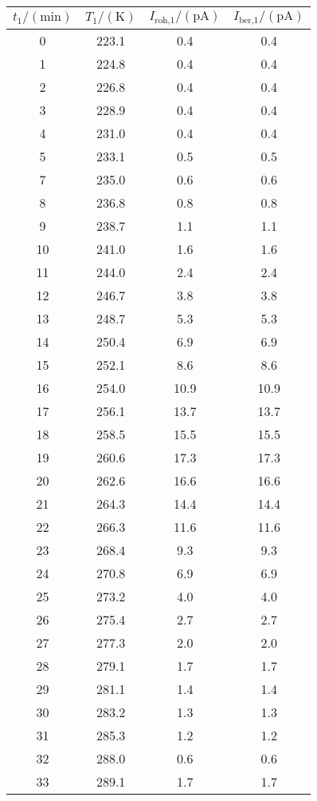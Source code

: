 \label{tab:tabData1}
	\begin{tabular}{S[table-format=2.0]S[table-format=3.1]S[table-format=2.1]S[table-format=2.1]}
		\toprule
		{$t_\text{1}/(\si{\minute})$} & {$T_\text{1}/(\si{\kelvin})$} & {$I_\text{roh,1}/(\si{\pico\ampere})$} & {$I_\text{ber,1}/(\si{\pico\ampere})$} \\
		 & 223.1 & 0.4 & 0.4 \\
		 1 & 224.8 & 0.4 & 0.4 \\
		 2 & 226.8 & 0.4 & 0.4 \\
		 3 & 228.9 & 0.4 & 0.4 \\
		 4 & 231.0 & 0.4 & 0.4 \\
		 5 & 233.1 & 0.5 & 0.5 \\
		 7 & 235.0 & 0.6 & 0.6 \\
		 8 & 236.8 & 0.8 & 0.8 \\
		 9 & 238.7 & 1.1 & 1.1 \\
		10 & 241.0 & 1.6 & 1.6 \\
		11 & 244.0 & 2.4 & 2.4 \\
		12 & 246.7 & 3.8 & 3.8 \\
		13 & 248.7 & 5.3 & 5.3 \\
		14 & 250.4 & 6.9 & 6.9 \\
		15 & 252.1 & 8.6 & 8.6 \\
		16 & 254.0 & 10.9 & 10.9 \\
		17 & 256.1 & 13.7 & 13.7 \\
		18 & 258.5 & 15.5 & 15.5 \\
		19 & 260.6 & 17.3 & 17.3 \\
		20 & 262.6 & 16.6 & 16.6 \\
		21 & 264.3 & 14.4 & 14.4 \\
		22 & 266.3 & 11.6 & 11.6 \\
		23 & 268.4 & 9.3 & 9.3 \\
		24 & 270.8 & 6.9 & 6.9 \\
		25 & 273.2 & 4.0 & 4.0 \\
		26 & 275.4 & 2.7 & 2.7 \\
		27 & 277.3 & 2.0 & 2.0 \\
		28 & 279.1 & 1.7 & 1.7 \\
		29 & 281.1 & 1.4 & 1.4 \\
		30 & 283.2 & 1.3 & 1.3 \\
		31 & 285.3 & 1.2 & 1.2 \\
		32 & 288.0 & 0.6 & 0.6 \\
		33 & 289.1 & 1.7 & 1.7 \\

\end{tabular}
